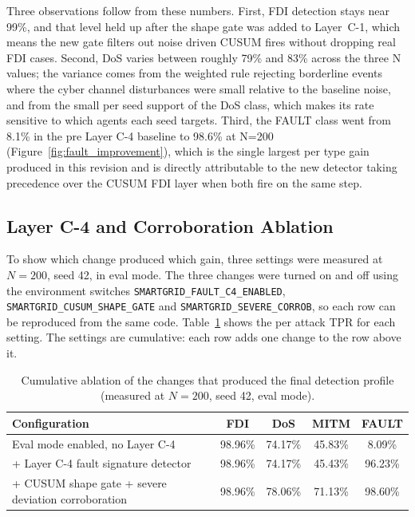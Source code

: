 \noindent
Three observations follow from these numbers. First, FDI detection stays near 99\%, and that level held up after the shape gate was added to Layer~C-1, which means the new gate filters out noise driven CUSUM fires without dropping real FDI cases. Second, DoS varies between roughly 79\% and 83\% across the three N values; the variance comes from the weighted rule rejecting borderline events where the cyber channel disturbances were small relative to the baseline noise, and from the small per seed support of the DoS class, which makes its rate sensitive to which agents each seed targets. Third, the FAULT class went from 8.1\% in the pre Layer C-4 baseline to 98.6\% at N=200 (Figure~\ref{fig:fault_improvement}), which is the single largest per type gain produced in this revision and is directly attributable to the new detector taking precedence over the CUSUM FDI layer when both fire on the same step.

\par \vspace{0.35cm}

\subsection{Layer C-4 and Corroboration Ablation}

To show which change produced which gain, three settings were measured at $N=200$, seed 42, in eval mode. The three changes were turned on and off using the environment switches \texttt{SMARTGRID\_FAULT\_C4\_ENABLED}, \texttt{SMARTGRID\_CUSUM\_SHAPE\_GATE} and \texttt{SMARTGRID\_SEVERE\_CORROB}, so each row can be reproduced from the same code. Table~\ref{tab:c4_ablation} shows the per attack TPR for each setting. The settings are cumulative: each row adds one change to the row above it.

\begin{table}[H]
\centering
\caption{Cumulative ablation of the changes that produced the final detection profile (measured at $N=200$, seed 42, eval mode).}
\label{tab:c4_ablation}
\begin{tabular}{|l|c|c|c|c|}
\hline
\textbf{Configuration} & \textbf{FDI} & \textbf{DoS} & \textbf{MITM} & \textbf{FAULT} \\ \hline
Eval mode enabled, no Layer C-4 & 98.96\% & 74.17\% & 45.83\% & 8.09\% \\ \hline
+ Layer C-4 fault signature detector & 98.96\% & 74.17\% & 45.43\% & 96.23\% \\ \hline
+ CUSUM shape gate + severe deviation corroboration & 98.96\% & 78.06\% & 71.13\% & 98.60\% \\ \hline
\end{tabular}
\end{table}

